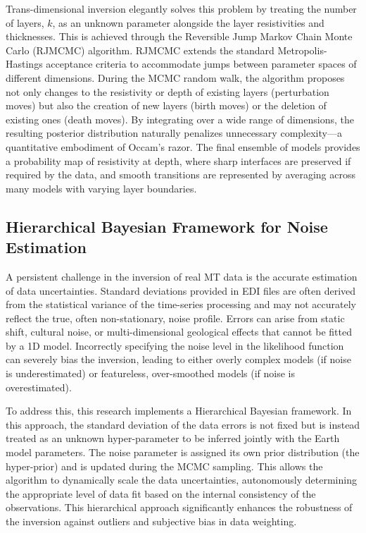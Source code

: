 Trans-dimensional inversion elegantly solves this problem by treating the number of layers, $k$, as an unknown parameter alongside the layer resistivities and thicknesses. This is achieved through the Reversible Jump Markov Chain Monte Carlo (RJMCMC) algorithm. RJMCMC extends the standard Metropolis-Hastings acceptance criteria to accommodate jumps between parameter spaces of different dimensions. During the MCMC random walk, the algorithm proposes not only changes to the resistivity or depth of existing layers (perturbation moves) but also the creation of new layers (birth moves) or the deletion of existing ones (death moves). By integrating over a wide range of dimensions, the resulting posterior distribution naturally penalizes unnecessary complexity—a quantitative embodiment of Occam's razor. The final ensemble of models provides a probability map of resistivity at depth, where sharp interfaces are preserved if required by the data, and smooth transitions are represented by averaging across many models with varying layer boundaries.

\subsection{Hierarchical Bayesian Framework for Noise Estimation}
A persistent challenge in the inversion of real MT data is the accurate estimation of data uncertainties. Standard deviations provided in EDI files are often derived from the statistical variance of the time-series processing and may not accurately reflect the true, often non-stationary, noise profile. Errors can arise from static shift, cultural noise, or multi-dimensional geological effects that cannot be fitted by a 1D model. Incorrectly specifying the noise level in the likelihood function can severely bias the inversion, leading to either overly complex models (if noise is underestimated) or featureless, over-smoothed models (if noise is overestimated).

To address this, this research implements a Hierarchical Bayesian framework. In this approach, the standard deviation of the data errors is not fixed but is instead treated as an unknown hyper-parameter to be inferred jointly with the Earth model parameters. The noise parameter is assigned its own prior distribution (the hyper-prior) and is updated during the MCMC sampling. This allows the algorithm to dynamically scale the data uncertainties, autonomously determining the appropriate level of data fit based on the internal consistency of the observations. This hierarchical approach significantly enhances the robustness of the inversion against outliers and subjective bias in data weighting.

